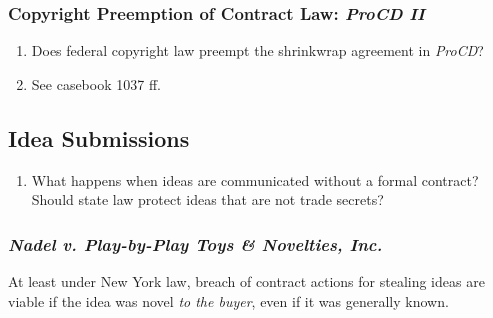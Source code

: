 \subsubsection{Copyright Preemption of Contract Law: \emph{ProCD II}}

\begin{enumerate}
    \item Does federal copyright law preempt the shrinkwrap agreement in 
    \emph{ProCD}?
    \item See casebook 1037 ff.
\end{enumerate}

\subsection{Idea Submissions}

\begin{enumerate}
    \item What happens when ideas are communicated without a formal contract? 
    Should state law protect ideas that are not trade secrets?
\end{enumerate}

\subsubsection{\emph{Nadel v. Play-by-Play Toys \& Novelties, Inc.}}

At least under New York law, breach of contract actions for stealing ideas are 
viable if the idea was novel \emph{to the buyer}, even if it was generally 
known.

